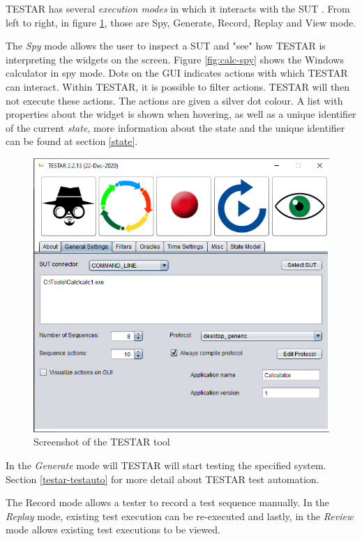     TESTAR has several \emph{execution modes} in which it interacts with the SUT \cite{testar-manual}. From left to right, in figure \ref{fig:testar}, those are Spy, Generate, Record, Replay and View mode. 

    The \emph{Spy} mode allows the user to inspect a SUT and "see" how TESTAR is interpreting the widgets on the screen. Figure \ref{fig:calc-spy} shows the Windows calculator in spy mode. Dots on the GUI indicates actions with which TESTAR can interact. Within TESTAR, it is possible to filter actions. TESTAR will then not execute these actions. The actions are given a silver dot colour. A list with properties about the widget is shown when hovering, as well as a unique identifier of the current \emph{state}, more information about the state and the unique identifier can be found at section \ref{state}.

    \begin{figure}[h]
        \includegraphics[scale=0.5]{pics/testar.png}
        \caption{Screenshot of the TESTAR tool}
        \label{fig:testar}
    \end{figure}

    In the \emph{Generate} mode will TESTAR will start testing the specified system. Section \ref{testar-testauto} for more detail about TESTAR test automation. 
    
    The \emph{}{Record} mode allows a tester to record a test sequence manually. In the \emph{Replay} mode, existing test execution can be re-executed and lastly, in the \emph{Review} mode allows existing test executions to be viewed. 

